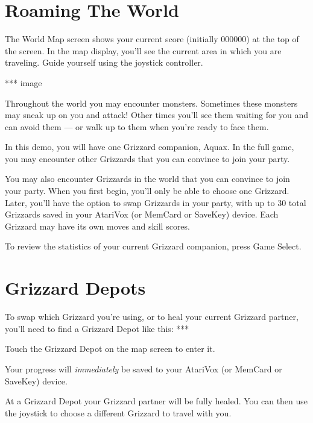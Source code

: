 \documentclass[12pt,twoside,openright,book]{memoir}
\begin{document}
\fi

\section{Roaming The World}

\ifdef\TVNTSC
\else
The World Map screen shows your  current score (initially 000000) at the
top of the screen.
\fi
In the map display, you'll see the current area in which you
are traveling. Guide yourself using the joystick controller.

*** image

Throughout  the  world  you  may  encounter  monsters.  Sometimes  these
monsters may  sneak up on  you and attack!  Other times you'll  see them
waiting for you  and can avoid them  --- or walk up to  them when you're
ready to face them.

\ifdef\DEMO
In this demo,  you will have one Grizzard companion,  Aquax. In the full
game, you  may encounter other Grizzards  that you can convince  to join
your party.

\else

You may also  encounter Grizzards in the world that  you can convince to
join your party. When you first begin, you'll only be able to choose one
Grizzard. Later, you'll have the option to swap Grizzards in your party,
with up  to 30  total Grizzards  saved in your  AtariVox (or  MemCard or
SaveKey) device. Each Grizzard may have its own moves and skill scores.

\fi

To  review the  statistics  of your  current  Grizzard companion,  press
Game Select.

\section{Grizzard Depots}

To \ifdef\DEMO\else  swap which  Grizzard you're using,  or to  \fi heal
your current Grizzard partner, you'll need to find a Grizzard Depot like
this: ***

Touch the Grizzard Depot on the map screen to enter it.

Your  progress will  \emph{immediately} be  saved to  your AtariVox  (or
MemCard or SaveKey) device.

At  a  Grizzard  Depot  your  Grizzard partner  will  be  fully  healed.
\ifdef\DEMO\else You  can then  use the joystick  to choose  a different
Grizzard to travel with you. \fi
\end{document}
